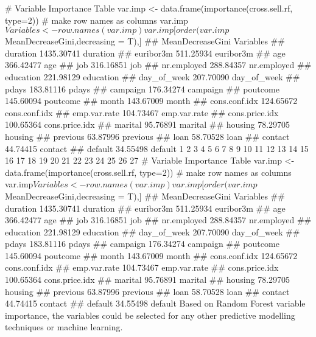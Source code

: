 # Variable Importance Table
var.imp <- data.frame(importance(cross.sell.rf,
           type=2))
# make row names as columns
var.imp$Variables <- row.names(var.imp)
var.imp[order(var.imp$MeanDecreaseGini,decreasing = T),]
##                MeanDecreaseGini      Variables
## duration             1435.30741       duration
## euribor3m             511.25934      euribor3m
## age                   366.42477            age
## job                   316.16851            job
## nr.employed           288.84357    nr.employed
## education             221.98129      education
## day_of_week           207.70090    day_of_week
## pdays                 183.81116          pdays
## campaign              176.34274       campaign
## poutcome              145.60094       poutcome
## month                 143.67009          month
## cons.conf.idx         124.65672  cons.conf.idx
## emp.var.rate          104.73467   emp.var.rate
## cons.price.idx        100.65364 cons.price.idx
## marital                95.76891        marital
## housing                78.29705        housing
## previous               63.87996       previous
## loan                   58.70528           loan
## contact                44.74415        contact
## default                34.55498        default
1
2
3
4
5
6
7
8
9
10
11
12
13
14
15
16
17
18
19
20
21
22
23
24
25
26
27
# Variable Importance Table
var.imp <- data.frame(importance(cross.sell.rf,
           type=2))
# make row names as columns
var.imp$Variables <- row.names(var.imp)
var.imp[order(var.imp$MeanDecreaseGini,decreasing = T),]
##                MeanDecreaseGini      Variables
## duration             1435.30741       duration
## euribor3m             511.25934      euribor3m
## age                   366.42477            age
## job                   316.16851            job
## nr.employed           288.84357    nr.employed
## education             221.98129      education
## day_of_week           207.70090    day_of_week
## pdays                 183.81116          pdays
## campaign              176.34274       campaign
## poutcome              145.60094       poutcome
## month                 143.67009          month
## cons.conf.idx         124.65672  cons.conf.idx
## emp.var.rate          104.73467   emp.var.rate
## cons.price.idx        100.65364 cons.price.idx
## marital                95.76891        marital
## housing                78.29705        housing
## previous               63.87996       previous
## loan                   58.70528           loan
## contact                44.74415        contact
## default                34.55498        default
Based on Random Forest variable importance, the variables could be selected for any other predictive modelling techniques or machine learning.


